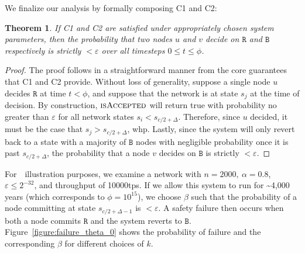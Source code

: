 \documentclass[letterpaper,twocolumn,10pt]{article}
\newtheorem{theorem}{Theorem}
\theoremstyle{definition}
\begin{document}
\begin{appendices}
We finalize our analysis by formally composing C1 and C2: 
\begin{theorem}
    If C1 and C2 are satisfied under appropriately chosen system parameters, then the probability that two nodes $u$ and $v$ decide on $\mathtt{R}$ and $\mathtt{B}$ respectively is strictly $< \varepsilon$ over all timesteps $0 \leq t \leq \phi$. 
\end{theorem}
\begin{proof}
    The proof follows in a straightforward manner from the core guarantees that C1 and C2 provide. Without loss of generality, suppose a single node $u$ decides $\mathtt{R}$ at time $t < \phi$, and suppose that the network is at state $s_j$ at the time of decision. By construction, $\textsc{isAccepted}$ will return true with probability no greater than $\varepsilon$ for all network states $s_i < s_{c/2 + \Delta}$. Therefore, since $u$ decided, it must be the case that $s_j > s_{c/2 + \Delta}$, whp. Lastly, since the system will only revert back to a state with a majority of $\mathtt{B}$ nodes with negligible probability once it is past $s_{c/2 + \Delta}$, the probability that a node $v$ decides on $\mathtt{B}$ is strictly $< \varepsilon$.
\end{proof}

For\ \ illustration purposes, we examine a network with $n = 2000,\ \alpha = 0.8$, $\varepsilon \leq 2^{-32}$, and throughput of 10000tps.
If we allow this system to run for \textasciitilde{}4,000 years (which corresponds to $\phi = 10^{15}$), we choose $\beta$ such that the probability of a node committing
at state $s_{c/2+\Delta - 1}$ is $< \varepsilon$.
A safety failure then occurs when both a node commits $\mathtt{R}$ and the system reverts to $\mathtt{B}$. Figure~\ref{figure:failure_theta_0} shows the probability of failure and the corresponding $\beta$ for different choices of $k$.


\end{appendices}
\end{document}
